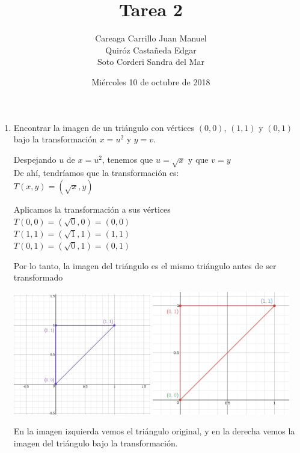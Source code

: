 \documentclass{article}
\begin{document}
    \title{Tarea 2}
    \author{Careaga Carrillo Juan Manuel\\
            Quiróz Castañeda Edgar\\
            Soto Corderi Sandra del Mar}
    \date{Miércoles 10 de octubre de 2018}
    \maketitle
    \begin{enumerate}

        \item {
            Encontrar la imagen de un triángulo con vértices $(0,0)$, $(1,1)$
            y $(0,1)$ bajo la transformación $x=u^2$ y $y=v$.

            \color{azul}
            Despejando $u$ de $x=u^2$, tenemos que $u=\sqrt{x}$ y que $v = y$\\
            De ahí, tendríamos que la transformación es:\\
            $T(x,y) = (\sqrt{x} , y)$

           	Aplicamos la transformación a sus vértices\\
            $T(0,0) = (\sqrt{0}, 0) = (0,0)$\\
            $T(1,1) = (\sqrt{1}, 1) = (1,1)$\\
            $T(0,1) = (\sqrt{0}, 1) = (0,1)$

            Por lo tanto, la imagen del triángulo es el mismo triángulo antes
            de ser transformado
            \begin{center}
                \includegraphics[width=6cm]{img/ejercicio1.png}
                \hspace{.5cm}
                \includegraphics[width=6cm]{img/ejercicio1-1.png}
        	\end{center}
            En la imagen izquierda vemos el triángulo original, y en la derecha
            vemos la imagen del triángulo bajo la transformación.
	    }


\end{enumerate}
\end{document}
